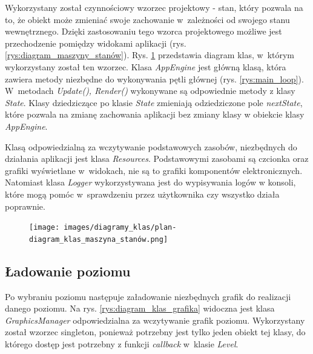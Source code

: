 \documentclass[12pt, a4paper]{article} %
\begin{document}
\aka Wykorzystany został czynnościowy wzorzec projektowy - stan, który pozwala na to, że obiekt może zmieniać swoje zachowanie w~zależności od swojego stanu wewnętrznego. Dzięki zastosowaniu tego wzorca projektowego możliwe jest przechodzenie pomiędzy widokami aplikacji (rys. \ref{rys:diagram_maszyny_stanów}). Rys. \ref{rys:diagram_klas_stanów} przedstawia diagram klas, w~którym wykorzystany został ten wzorzec. Klasa \textit{AppEngine} jest główną klasą, która zawiera metody niezbędne do wykonywania pętli głównej (rys. \ref{rys:main_loop}). W~metodach \textit{Update(), Render()} wykonywane są odpowiednie metody z klasy \textit{State}. Klasy dziedziczące po klasie \textit{State} zmieniają odziedziczone pole \textit{nextState}, które pozwala na zmianę zachowania aplikacji bez zmiany klasy w obiekcie klasy \textit{AppEngine}.

\aka Klasą odpowiedzialną za wczytywanie podstawowych zasobów, niezbędnych do działania aplikacji jest klasa \textit{Resources}. Podstawowymi zasobami są czcionka oraz grafiki wyświetlane w~widokach, nie są to grafiki komponentów elektronicznych. Natomiast klasa \textit{Logger} wykorzystywana jest do wypisywania logów w konsoli, które mogą pomóc w~sprawdzeniu przez użytkownika czy wszystko działa poprawnie.

\begin{landscape}
	\begin{figure}
		\centering
		\texttt{[image: images/diagramy\_klas/plan-diagram\_klas\_maszyna\_stanów.png]}
		\caption{}
		\label{rys:diagram_klas_stanów}
	\end{figure}
	\end{landscape}




\subsection{Ładowanie poziomu}
\aka Po wybraniu poziomu następuje załadowanie niezbędnych grafik do realizacji danego poziomu. Na rys. \ref{rys:diagram_klas_grafika} widoczna jest klasa \textit{GraphicsManager} odpowiedzialna za wczytywanie grafik poziomu. Wykorzystany został wzorzec singleton, ponieważ potrzebny jest tylko jeden obiekt tej klasy, do którego dostęp jest potrzebny z funkcji \textit{callback} w~klasie \textit{Level}.
\end{document}
